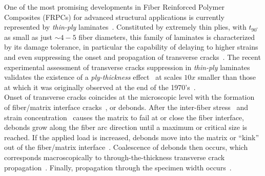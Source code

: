 \documentclass[a4paper,fleqn]{cas-dc}
\begin{document}
One of the most promising developments in Fiber Reinforced Polymer Composites (FRPCs) for advanced structural applications is currently represented by \emph{thin-ply} laminates~\cite{Kopp2017}. Constituted by extremely thin plies, with $t_{90^{\circ}}$ as small as just $\sim4-5$ fiber diameters, this family of laminates is characterized by its damage tolerance, in particular the capability of delaying to higher strains and even suppressing the onset and propagation of transverse cracks~\cite{Cugnoni2018}. The recent experimental assessment of transverse cracks suppression in \emph{thin-ply} laminates~\cite{Sasayama2003,Saito2012,Amacher2014} validates the existence of a \emph{ply-thickness} effect~\cite{Amacher2014} at scales $10x$ smaller than those at which it was originally observed at the end of the 1970's~\cite{Bailey1979}.\\
Onset of transverse cracks coincides at the microscopic level with the formation of fiber/matrix interface cracks~\cite{Bailey1981}, or debonds. After the inter-fiber stress~\cite{Asp1996} and strain concentration~\cite{Kies1962} causes the matrix to fail at or close the fiber interface, debonds grow along the fiber arc direction until a maximum or critical size is reached. If the applied load is increased, debonds move into the matrix or ``kink'' out of the fiber/matrix interface~\cite{Zhang1997,Paris2007}. Coalescence of debonds then occurs, which corresponds macroscopically to through-the-thickness transverse crack propagation~\cite{Zhang1997,Zhuang2018b}. Finally, propagation through the specimen width occurs~\cite{Zhang1997}.\\
\end{document}
